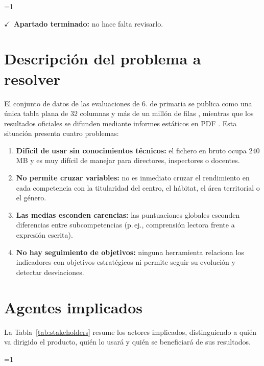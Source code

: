 \documentclass[12pt, a4paper, oneside]{report}
\newcommand{\mostrarterminados}{1}
\newenvironment{revisado}
  {\ifnum\mostrarterminados=1\relax\begin{cajarevisada}\noindent\colorbox{verdeterminado}{\parbox{\dimexpr\linewidth-2\fboxsep\relax}{\small$\checkmark$\ \textbf{Apartado terminado:} no hace falta revisarlo.}}\par\medskip\fi}
  {\ifnum\mostrarterminados=1\relax\end{cajarevisada}\fi}
\begin{document}
\begin{revisado}
\section{Descripción del problema a resolver}
\label{sec:problema}
El conjunto de datos de las evaluaciones de 6.\textordmasculine{} de primaria se publica como una única tabla plana de 32 columnas y más de un millón de filas \cite{transparencia_catalunya_2024}, mientras que los resultados oficiales se difunden mediante informes estáticos en PDF \cite{csase_resultats}. Esta situación presenta cuatro problemas:
\begin{enumerate}
    \item \textbf{Difícil de usar sin conocimientos técnicos:} el fichero en bruto ocupa 240 MB y es muy difícil de manejar para directores, inspectores o docentes.
    \item \textbf{No permite cruzar variables:} no es inmediato cruzar el rendimiento en cada competencia con la titularidad del centro, el hábitat, el área territorial o el género.
    \item \textbf{Las medias esconden carencias:} las puntuaciones globales esconden diferencias entre subcompetencias (p.\,ej., comprensión lectora frente a expresión escrita).
    \item \textbf{No hay seguimiento de objetivos:} ninguna herramienta relaciona los indicadores con objetivos estratégicos ni permite seguir su evolución y detectar desviaciones.
\end{enumerate}

\section{Agentes implicados}
La Tabla~\ref{tab:stakeholders} resume los actores implicados, distinguiendo a quién va dirigido el producto, quién lo usará y quién se beneficiará de sus resultados.


\end{revisado}
\end{document}
